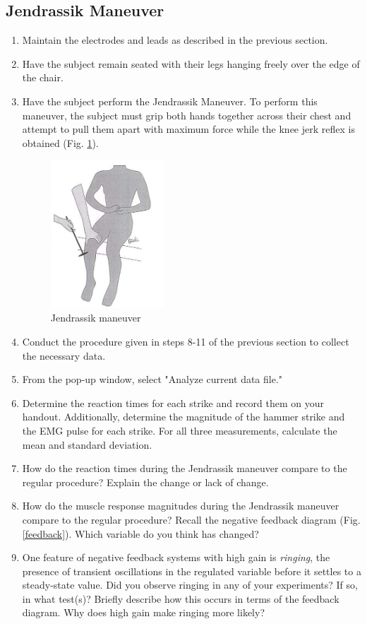 \documentclass{article}
\begin{document}
\subsection*{Jendrassik Maneuver}
\begin{enumerate}
	\item Maintain the electrodes and leads as described in the previous section.
	\item Have the subject remain seated with their legs hanging freely over the edge of the chair.
	\item Have the subject perform the Jendrassik Maneuver. To perform this maneuver, the subject must grip both hands together across their chest and attempt to pull them apart with maximum force while the knee jerk reflex is obtained (Fig. \ref{jendrassik}).
	
		\begin{figure}[h]
		\centering
		\includegraphics[width=0.4\textwidth]{../images/EMG_II_8.jpg}	
		\caption{Jendrassik maneuver}
		\label{jendrassik}
		\end{figure}

	\item Conduct the procedure given in steps 8-11 of the previous section to collect the necessary data.
	\item From the pop-up window, select "Analyze current data file."
	\item Determine the reaction times for each strike and record them on your handout. Additionally, determine the magnitude of the hammer strike and the EMG pulse for each strike. For all three measurements, calculate the mean and standard deviation.
	\item How do the reaction times during the Jendrassik maneuver compare to the regular procedure? Explain the change or lack of change.
	\item How do the muscle response magnitudes during the Jendrassik maneuver compare to the regular procedure? Recall the negative feedback diagram (Fig. \ref{feedback}). Which variable do you think has changed?
	\item One feature of negative feedback systems with high gain is \textit{ringing}, the presence of transient oscillations in the regulated variable before it settles to a steady-state value. Did you observe ringing in any of your experiments? If so, in what test(s)? Briefly describe how this occurs in terms of the feedback diagram. Why does high gain make ringing more likely?
\end{enumerate}
\end{document}
